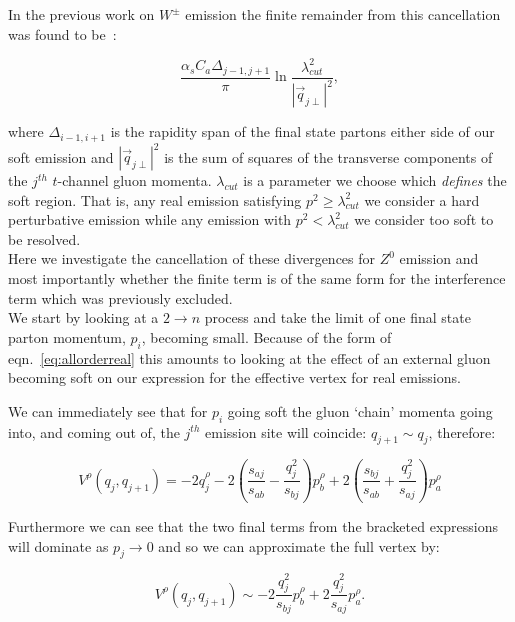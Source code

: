 		In the previous work on $W^\pm$ emission the finite remainder from this cancellation was found
		to be~\cite{Andersen:2009nu, Andersen:2008gc}:

		\begin{equation}
			\frac{\alpha_s C_a \Delta_{j-1, j+1}}{\pi}\ln{\frac{\lambda_{cut}^2}{|\vec{q}_{j\perp}|^2}},
		\end{equation}

		where $\Delta_{i-1, i+1}$ is the rapidity span of the final state partons either side of our
		soft emission and $|\vec{q}_{j\perp}|^2$ is the sum of squares of the transverse components of
		the $j^{th}$ $t$-channel gluon momenta.  $\lambda_{cut}$ is a parameter we choose which \emph{defines}
		the soft region.  That is, any real emission satisfying $p^2 \geq \lambda_{cut}^2$ we consider a hard perturbative
		emission while any emission with $p^2 < \lambda_{cut}^2$ we consider too soft to be resolved.\\
		Here we investigate
		the cancellation of these divergences for $Z^0$ emission and most importantly whether the finite term
		is of the same form for the interference term which was previously excluded.\\We start by looking
		at a $2\rightarrow n$ process and take the limit of one final state parton momentum, $p_i$, becoming
		small.  Because of the form of eqn.~\eqref{eq:allorderreal} this amounts to looking at the
		effect of an external gluon becoming soft on our expression for the effective vertex for real emissions.

		We can immediately see that for $p_i$ going soft the gluon `chain' momenta going into,
		and coming out of, the $j^{th}$ emission site will coincide: $q_{j+1}\sim q_j$, therefore:

		\begin{equation}
			V^\rho(q_j, q_{j+1}) = -2q_j^\rho - 2\left(\frac{s_{aj}}{s_{ab}} -
				\frac{q^2_{j}}{s_{bj}}\right)p_b^\rho + 2\left(\frac{s_{bj}}{s_{ab}} +
				\frac{q_j^2}{s_{aj}}\right)p_a^\rho
				\label{eqn:vertexlimit}
		\end{equation}

		Furthermore we can see that the two final terms from the bracketed expressions will dominate
		as $p_j\to0$ and so we can approximate the full vertex by:

		\begin{equation}
			V^\rho(q_j, q_{j+1}) \sim -2\frac{q^2_{j}}{s_{bj}}p_b^\rho + 2\frac{q_j^2}{s_{aj}}p_a^\rho.
				\label{eqn:vertexlimit2}
		\end{equation}

